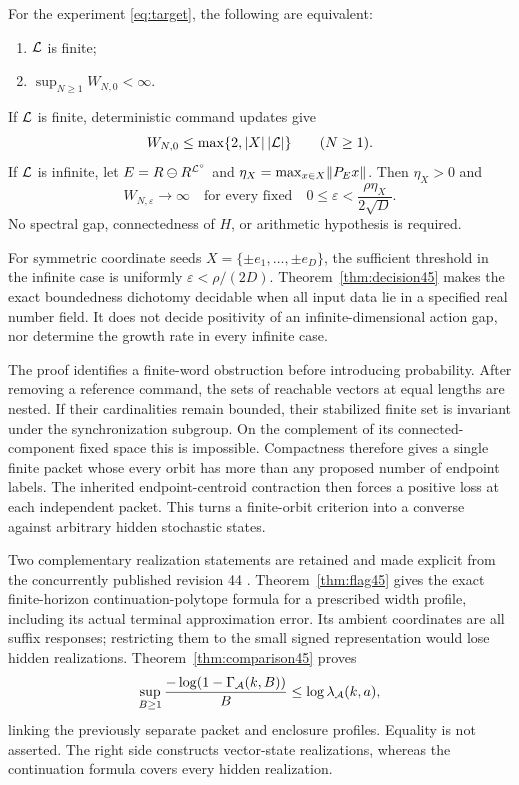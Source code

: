 \begin{theorem}\label{thm:main45}
For the experiment \eqref{eq:target}, the following are equivalent:
\begin{enumerate}
\item $\mathcal L$ is finite;
\item $\sup_{N\ge1}W_{N,0}<\infty$.
\end{enumerate}
If $\mathcal L$ is finite, deterministic command updates give
\[
 W_{N,0}\le\max\{2,|X|\,|\mathcal L|\}\qquad(N\ge1).
\]
If $\mathcal L$ is infinite, let $E=R\ominus R^{\mathcal L^\circ}$ and
$\eta_X=\max_{x\in X}\lVert P_E x\rVert$. Then $\eta_X>0$ and
\begin{equation}\label{eq:diverge45}
 W_{N,\varepsilon}\longrightarrow\infty
 \quad\text{for every fixed}\quad
 0\le\varepsilon<\frac{\rho\eta_X}{2\sqrt D}.
\end{equation}
No spectral gap, connectedness of $H$, or arithmetic hypothesis is required.
\end{theorem}

For symmetric coordinate seeds $X=\{\pm e_1,\ldots,\pm e_D\}$, the sufficient threshold in the infinite case is uniformly $\varepsilon<\rho/(2D)$. Theorem~\ref{thm:decision45} makes the exact boundedness dichotomy decidable when all input data lie in a specified real number field. It does not decide positivity of an infinite-dimensional action gap, nor determine the growth rate in every infinite case.

The proof identifies a finite-word obstruction before introducing probability. After removing a reference command, the sets of reachable vectors at equal lengths are nested. If their cardinalities remain bounded, their stabilized finite set is invariant under the synchronization subgroup. On the complement of its connected-component fixed space this is impossible. Compactness therefore gives a single finite packet whose every orbit has more than any proposed number of endpoint labels. The inherited endpoint-centroid contraction then forces a positive loss at each independent packet. This turns a finite-orbit criterion into a converse against arbitrary hidden stochastic states.

Two complementary realization statements are retained and made explicit from the concurrently published revision 44 \cite{GTF44}. Theorem~\ref{thm:flag45} gives the exact finite-horizon continuation-polytope formula for a prescribed width profile, including its actual terminal approximation error. Its ambient coordinates are all suffix responses; restricting them to the small signed representation would lose hidden realizations. Theorem~\ref{thm:comparison45} proves
\[
 \sup_{B\ge1}\frac{-\log(1-\Gamma_{\mathcal A}(k,B))}{B}
                 \le \log\lambda_{\mathcal A}(k,a),
\]
linking the previously separate packet and enclosure profiles. Equality is not asserted. The right side constructs vector-state realizations, whereas the continuation formula covers every hidden realization.

